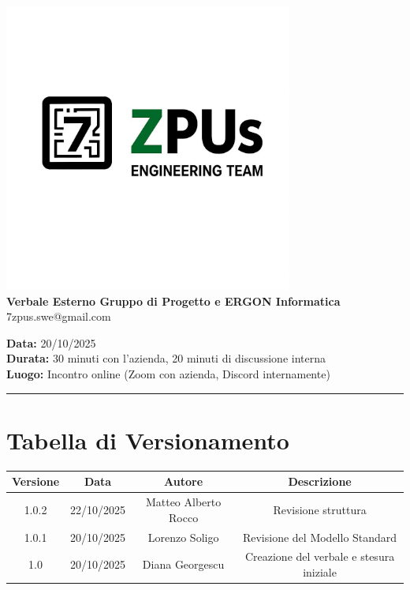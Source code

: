 \documentclass[a4paper,12pt]{article}
\begin{document}
\begin{center}
    \includegraphics[width=9.5cm]{../../../assets/logo7zpus.jpeg}\\
    \Large \textbf{Verbale Esterno Gruppo di Progetto e ERGON Informatica}\\
    \vspace{0.5cm}
    \small\hspace{10cm} 7zpus.swe@gmail.com
\end{center}


\noindent
\textbf{Data:} 20/10/2025 \\
\textbf{Durata:}  30 minuti con l'azienda, 20 minuti di discussione interna \\
\textbf{Luogo:} Incontro online (Zoom con azienda, Discord internamente)

\vspace{0.3cm}
\hrule
\vspace{0.5cm}

\tableofcontents

\newpage

\section{Tabella di Versionamento}
\begin{center}
\begin{tabular}{|c|c|c|c|}
    \hline
    \textbf{Versione} & \textbf{Data} & \textbf{Autore} & \textbf{Descrizione} \\
    \hline
    1.0.2 & 22/10/2025 & Matteo Alberto Rocco & Revisione struttura \\
    \hline
    1.0.1 & 20/10/2025 & Lorenzo Soligo & Revisione del Modello Standard \\
    \hline
    1.0 & 20/10/2025 & Diana Georgescu & Creazione del verbale e stesura iniziale \\
    \hline
\end{tabular}
\end{center}
\end{document}
